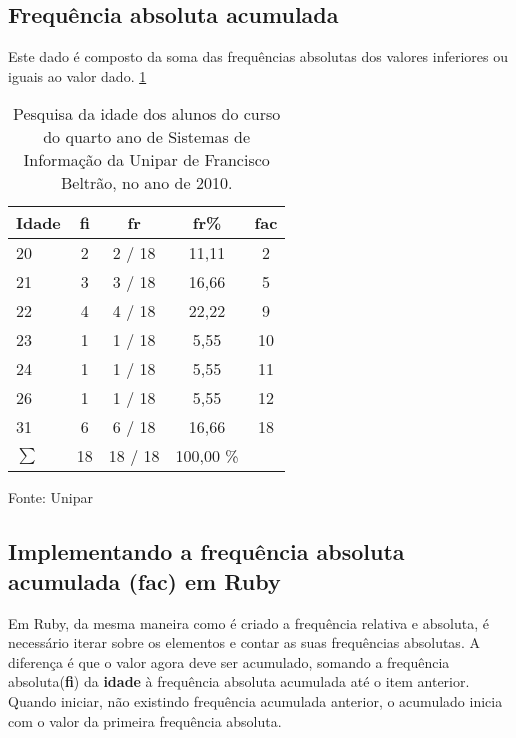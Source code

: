 \documentclass[espaco=simples,appendix=Name]{abnt}
\newcommand{\code}[1] {\textbf{#1}}
\begin{document}
\subsection{ Frequência absoluta acumulada} 

Este dado é composto da soma das frequências absolutas dos valores inferiores ou iguais ao valor dado. \ref{tabela FAC percentual}

\begin{table}
\caption{Pesquisa da idade dos alunos do curso do quarto ano de Sistemas de Informação da Unipar de Francisco Beltrão, no ano de 2010.}
\label{tabela FAC percentual}
\begin{tabular}{|l|c|c|c|c|} 
\hline 

Idade &  \code{fi} & \code{fr}  & \code{fr\%} & \code{fac}\\ \hline 
20    &      2       &      2 / 18  &   11,11  &      2 \\ 
21    &      3       &      3 / 18  &   16,66  &      5 \\
22    &      4       &      4 / 18  &   22,22  &      9 \\
23    &      1       &      1 / 18  &    5,55  &     10 \\
24    &      1       &      1 / 18  &    5,55  &     11 \\
26    &      1       &      1 / 18  &    5,55  &     12 \\
31    &      6       &      6 / 18  &   16,66  &     18 \\ 
\hline 
\begin{math}
\sum 
\end{math} & 18      &     18 / 18  & 100,00 \% & \\
\hline 
\end{tabular}
\small{Fonte: Unipar}
\end{table}


\subsection{ Implementando a frequência absoluta acumulada (fac) em Ruby} 

Em Ruby, da mesma maneira como é criado a frequência relativa e absoluta, é necessário iterar sobre os elementos e contar as suas frequências absolutas. A diferença é que o valor agora deve ser acumulado, somando a frequência absoluta(\code{fi}) da \code{idade } à frequência absoluta acumulada até o item anterior. Quando iniciar, não existindo frequência acumulada anterior, o acumulado inicia com o valor da primeira frequência absoluta.
\end{document}
